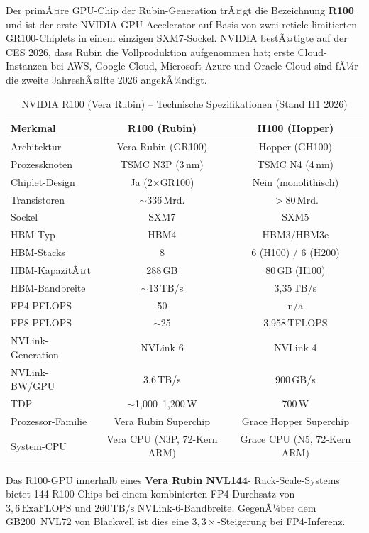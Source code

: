 ﻿\documentclass[12pt,a4paper]{article}
\begin{document}
Der primÃ¤re GPU-Chip der Rubin-Generation trÃ¤gt die Bezeichnung
\textbf{R100} und ist der erste NVIDIA-GPU-Accelerator auf
Basis von zwei reticle-limitierten GR100-Chiplets in einem
einzigen SXM7-Sockel. NVIDIA bestÃ¤tigte auf der CES 2026,
dass Rubin die Vollproduktion aufgenommen hat; erste
Cloud-Instanzen bei AWS, Google Cloud, Microsoft Azure und
Oracle Cloud sind fÃ¼r die zweite JahreshÃ¤lfte 2026 angekÃ¼ndigt.

\begin{table}[ht]
\centering
\small
\caption{NVIDIA R100 (Vera Rubin) -- Technische Spezifikationen (Stand H1 2026)}
\label{tab:r100_specs}
\begin{tabular}{@{}lcc@{}}
\toprule
\textbf{Merkmal} & \textbf{R100 (Rubin)} & \textbf{H100 (Hopper)} \\
\midrule
Architektur & Vera Rubin (GR100) & Hopper (GH100) \\
Prozessknoten & TSMC N3P (3\,nm) & TSMC N4 (4\,nm) \\
Chiplet-Design & Ja (2$\times$GR100) & Nein (monolithisch) \\
Transistoren & $\sim$336\,Mrd. & $>80\,\text{Mrd.}$ \\
Sockel & SXM7 & SXM5 \\
HBM-Typ & HBM4 & HBM3/HBM3e \\
HBM-Stacks & 8 & 6 (H100) / 6 (H200) \\
HBM-KapazitÃ¤t & 288\,GB & 80\,GB (H100) \\
HBM-Bandbreite & $\sim$13\,TB/s & 3,35\,TB/s \\
FP4-PFLOPS & 50 & n/a \\
FP8-PFLOPS & $\sim$25 & 3,958\,TFLOPS \\
NVLink-Generation & NVLink 6 & NVLink 4 \\
NVLink-BW/GPU & 3,6\,TB/s & 900\,GB/s \\
TDP & $\sim$1{,}000--1{,}200\,W & 700\,W \\
Prozessor-Familie & Vera Rubin Superchip & Grace Hopper Superchip \\
System-CPU & Vera CPU (N3P, 72-Kern ARM) & Grace CPU (N5, 72-Kern ARM) \\
\bottomrule
\end{tabular}
\end{table}

\noindent Das R100-GPU innerhalb eines \textbf{Vera Rubin NVL144}-
Rack-Scale-Systems bietet 144 R100-Chips bei einem kombinierten
FP4-Durchsatz von $3{,}6\,\text{ExaFLOPS}$ und $260\,\text{TB/s}$
NVLink-6-Bandbreite. GegenÃ¼ber dem GB200~NVL72 von Blackwell
ist dies eine $3{,}3\times$-Steigerung bei FP4-Inferenz.
\end{document}

